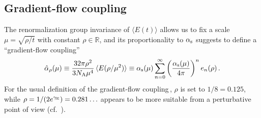 \label{sec:couplingandmass}

\subsection{Gradient-flow coupling}

The renormalization group invariance of $\langle E(t)\rangle$ allows us
to fix a scale $\mu=\sqrt{\rho/t}$ with constant $\rho\in\mathbb{R}$,
and its proportionality to $\alpha_\mathrm{s}$ suggests to define a
``gradient-flow coupling''
\begin{equation}
  \begin{split}
    \hat\alpha_\rho(\mu) \equiv \frac{32\pi\rho^2}{3N_\mathrm{A}\mu^4}\,\langle
    E(\rho/\mu^2)\rangle \equiv
    \alpha_\mathrm{s}(\mu)\sum_{n=0}^\infty\left(\frac{\alpha_\mathrm{s}(\mu)}{4\pi}\right)^n
    e_{n}(\rho)\,.
  \end{split}
\end{equation}
For the usual definition of the gradient-flow
coupling\,\cite{Luscher:2010iy}, $\rho$ is set to $1/8=0.125$, while
$\rho=1/(2e^{\gamma_\mathrm{E}})=0.281\ldots$ appears to be more suitable from
a perturbative point of view (cf.\ ).

